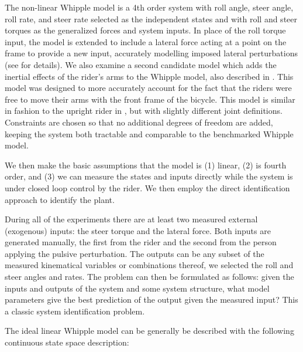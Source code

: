 \documentclass[a4paper]{article}
\begin{document}
The non-linear Whipple model is a 4th order system with roll angle, steer
angle, roll rate, and steer rate selected as the independent states and with
roll and steer torques as the generalized forces and system inputs. In place 
of the roll torque input, the model is extended to include a lateral
force acting at a point on the frame to provide a new input, accurately
modelling imposed lateral perturbations (see \cite{Moore2012} for details). 
We also examine a second candidate model which adds the
inertial effects of the rider's arms to the Whipple model, also described in
\cite{Moore2012}. This model was designed to more accurately account for the
fact that the riders were free to move their arms with the front frame of the
bicycle. This model is similar in fashion to the upright rider in
\cite{Schwab2010a}, but with slightly different joint definitions. Constraints
are chosen so that no additional degrees of freedom are added, keeping the
system both tractable and comparable to the benchmarked Whipple model.

We then make the basic assumptions that the model is (1) linear, (2) is fourth
order, and (3) we can measure the states and inputs directly while the system
is under closed loop control by the rider. We then employ the direct
identification approach to identify the plant.

During all of the experiments there are at least two measured external
(exogenous) inputs: the steer torque and the lateral force. Both inputs are
generated manually, the first from the rider and the second from the person
applying the pulsive perturbation. The outputs can be any subset of the
measured kinematical variables or combinations thereof, we selected the roll
and steer angles and rates. The problem can then be formulated as follows:
given the inputs and outputs of the system and some system structure, what
model parameters give the best prediction of the output given the measured
input? This a classic system identification problem.

The ideal linear Whipple model can be generally be described with the following
continuous state space description:
\end{document}
